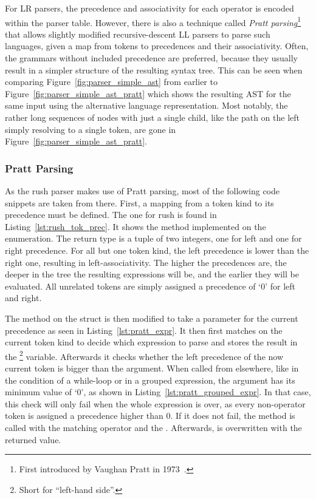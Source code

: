 For LR parsers, the precedence and associativity for each operator is encoded within the parser table.
However, there is also a technique called \emph{Pratt parsing}\footnote{First introduced by Vaughan Pratt in 1973~\cite{Pratt1973}.} that allows slightly modified recursive-descent LL parsers to parse such languages, given a map from tokens to precedences and their associativity.
Often, the grammars without included precedence are preferred, because they usually result in a simpler structure of the resulting syntax tree.
This can be seen when comparing Figure~\ref{fig:parser_simple_ast} from earlier to Figure~\ref{fig:parser_simple_ast_pratt} which shows the resulting AST for the same input using the alternative language representation.
Most notably, the rather long sequences of nodes with just a single child, like the path on the left simply resolving to a single  token, are gone in Figure~\ref{fig:parser_simple_ast_pratt}.

\subsubsection{Pratt Parsing}

As the rush parser makes use of Pratt parsing, most of the following code snippets are taken from there.
First, a mapping from a token kind to its precedence must be defined.
The one for rush is found in Listing~\ref{lst:rush_tok_prec}.
It shows the  method implemented on the  enumeration.
The return type is a tuple of two integers, one for left and one for right precedence.
For all but one token kind, the left precedence is lower than the right one, resulting in left-associativity.
The higher the precedences are, the deeper in the tree the resulting expressions will be, and the earlier they will be evaluated.
All unrelated tokens are simply assigned a precedence of `0' for left and right.


The  method on the  struct is then modified to take a parameter for the current precedence as seen in Listing~\ref{lst:pratt_expr}.
It then first matches on the current token kind to decide which expression to parse and stores the result in the \footnote{Short for \enquote{left-hand side}.} variable.
Afterwards it checks whether the left precedence of the now current token is bigger than the  argument.
When called from elsewhere, like in the condition of a while-loop or in a grouped expression, the  argument has its minimum value of `0', as shown in Listing~\ref{lst:pratt_grouped_expr}.
In that case, this check will only fail when the whole expression is over, as every non-operator token is assigned a precedence higher than 0.
If it does not fail, the  method is called with the matching operator and the .
Afterwards,  is overwritten with the returned value.

